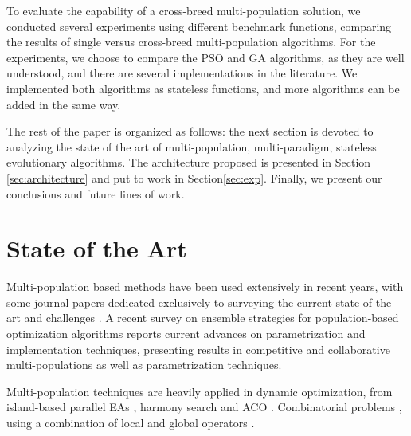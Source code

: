 \documentclass[runningheads]{llncs}
\begin{document}

To evaluate the capability of a cross-breed multi-population solution,
we conducted several experiments using different benchmark functions, comparing the
results of single versus cross-breed multi-population algorithms. For the experiments, we choose to
compare the PSO and GA algorithms, as they are well understood, and there are
several implementations in the literature. We implemented both algorithms as
stateless functions, and more algorithms can be added in the same way.



The rest of the paper is organized as follows: the next section is devoted
to analyzing the state of the art of multi-population, multi-paradigm,
stateless evolutionary algorithms. The architecture proposed is
presented in Section \ref{sec:architecture} and put to work in Section\ref{sec:exp}.
Finally, we present our conclusions and future lines of work.

\section{State of the Art}


Multi-population based methods have been used extensively in recent years, with
some journal papers dedicated exclusively to surveying the current state of the
art \cite{ma2019multi} and challenges \cite{li2015multi}. A recent survey on
ensemble strategies for population-based optimization algorithms
\cite{wu2019ensemble} reports current advances on parametrization and
implementation techniques, presenting results in competitive and collaborative
multi-populations as well as parametrization techniques.

Multi-population techniques are heavily applied in dynamic optimization, from
island-based parallel EAs \cite{lissovoi2017runtime}, harmony search
\cite{turky2014multi} and ACO \cite{nseef2016adaptive}. Combinatorial problems
\cite{pourvaziri2014hybrid}, using a combination of local and global operators
\cite{bai2018integrated}.
\end{document}
